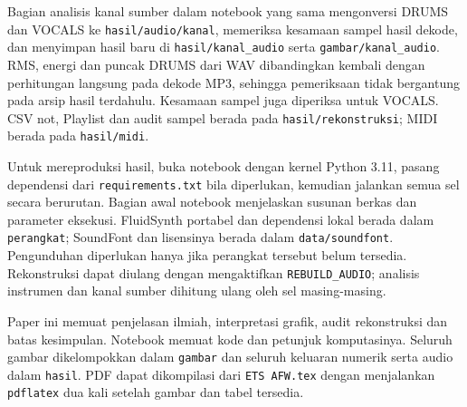 Bagian analisis kanal sumber dalam notebook yang sama mengonversi
DRUMS dan VOCALS ke \texttt{hasil/audio/kanal}, memeriksa kesamaan
sampel hasil dekode, dan menyimpan hasil baru di
\texttt{hasil/kanal\_audio} serta \texttt{gambar/kanal\_audio}.
RMS, energi dan puncak DRUMS dari WAV dibandingkan kembali dengan
perhitungan langsung pada dekode MP3, sehingga pemeriksaan tidak
bergantung pada arsip hasil terdahulu. Kesamaan sampel juga diperiksa
untuk VOCALS. CSV not, Playlist dan audit sampel berada pada
\texttt{hasil/rekonstruksi}; MIDI berada pada \texttt{hasil/midi}.

Untuk mereproduksi hasil, buka notebook dengan kernel Python 3.11,
pasang dependensi dari \texttt{requirements.txt} bila diperlukan,
kemudian jalankan semua sel secara berurutan. Bagian awal notebook
menjelaskan susunan berkas dan parameter eksekusi. FluidSynth portabel
dan dependensi lokal berada dalam \texttt{perangkat}; SoundFont dan
lisensinya berada dalam \texttt{data/soundfont}. Pengunduhan diperlukan
hanya jika perangkat tersebut belum tersedia. Rekonstruksi dapat
diulang dengan mengaktifkan \texttt{REBUILD\_AUDIO}; analisis instrumen
dan kanal sumber dihitung ulang oleh sel masing-masing.

Paper ini memuat penjelasan ilmiah, interpretasi grafik, audit
rekonstruksi dan batas kesimpulan. Notebook memuat kode dan petunjuk
komputasinya. Seluruh gambar dikelompokkan dalam \texttt{gambar}
dan seluruh keluaran numerik serta audio dalam \texttt{hasil}.
PDF dapat dikompilasi dari \texttt{ETS AFW.tex} dengan menjalankan
\texttt{pdflatex} dua kali setelah gambar dan tabel tersedia.
